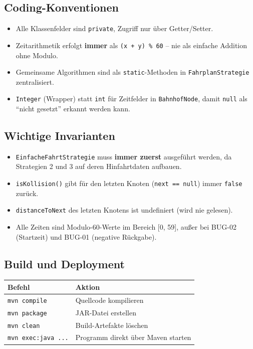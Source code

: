 \documentclass[12pt,a4paper]{article}
\begin{document}
\subsection{Coding-Konventionen}

\begin{itemize}
    \item Alle Klassenfelder sind \texttt{private}, Zugriff nur über Getter/Setter.
    \item Zeitarithmetik erfolgt \textbf{immer} als \texttt{(x + y) \% 60} -- nie als einfache Addition ohne Modulo.
    \item Gemeinsame Algorithmen sind als \texttt{static}-Methoden in \texttt{FahrplanStrategie} zentralisiert.
    \item \texttt{Integer} (Wrapper) statt \texttt{int} für Zeitfelder in \texttt{BahnhofNode}, damit \texttt{null} als ``nicht gesetzt'' erkannt werden kann.
\end{itemize}

\subsection{Wichtige Invarianten}

\begin{itemize}
    \item \texttt{EinfacheFahrtStrategie} muss \textbf{immer zuerst} ausgeführt werden, da Strategien 2 und 3 auf deren Hinfahrtdaten aufbauen.
    \item \texttt{isKollision()} gibt für den letzten Knoten (\texttt{next == null}) immer \texttt{false} zurück.
    \item \texttt{distanceToNext} des letzten Knotens ist undefiniert (wird nie gelesen).
    \item Alle Zeiten sind Modulo-60-Werte im Bereich [0, 59], außer bei BUG-02 (Startzeit) und BUG-01 (negative Rückgabe).
\end{itemize}

\subsection{Build und Deployment}

\begin{center}
\begin{tabular}{ll}
\toprule
\textbf{Befehl} & \textbf{Aktion} \\
\midrule
\texttt{mvn compile} & Quellcode kompilieren \\
\texttt{mvn package} & JAR-Datei erstellen \\
\texttt{mvn clean} & Build-Artefakte löschen \\
\texttt{mvn exec:java ...} & Programm direkt über Maven starten \\
\bottomrule
\end{tabular}
\end{center}
\end{document}
